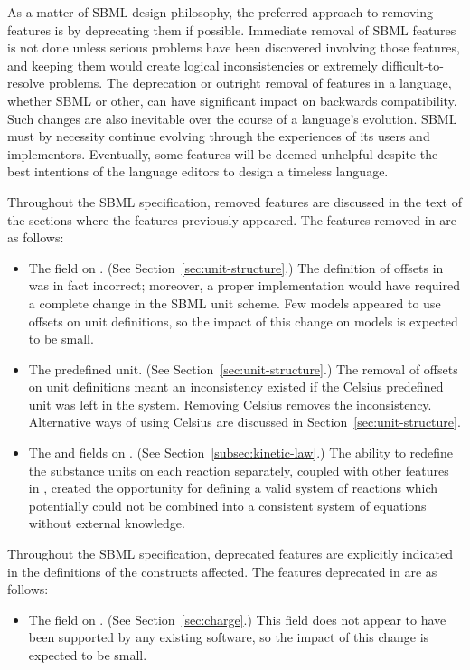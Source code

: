 As a matter of SBML design philosophy, the preferred approach to
removing features is by deprecating them if possible.  Immediate
removal of SBML features is not done unless serious problems have
been discovered involving those features, and keeping them would
create logical inconsistencies or extremely difficult-to-resolve
problems.  The deprecation or outright removal of features in a
language, whether SBML or other, can have significant impact on
backwards compatibility.  Such changes are also inevitable over
the course of a language's evolution.  SBML must by necessity
continue evolving through the experiences of its users and
implementors.  Eventually, some features will be deemed unhelpful
despite the best intentions of the language editors to design a
timeless language.

Throughout the SBML specification, removed features are discussed
in the text of the sections where the features previously appeared.
The features removed in \changed{\sbmltwothree} are as follows:
\begin{itemize}
  
\item The  field on \UnitDefinition.  (See
  Section~\ref{sec:unit-structure}.)  The definition of offsets in
  \sbmltwoone was in fact incorrect; moreover, a proper
  implementation would have required a complete change in the SBML
  unit scheme.  Few models appeared to use offsets on unit
  definitions, so the impact of this change on models is expected
  to be small.
  
\item The  predefined unit.  (See
  Section~\ref{sec:unit-structure}.)  The removal of offsets on
  unit definitions meant an inconsistency existed if the Celsius
  predefined unit was left in the system.  Removing Celsius
  removes the inconsistency.  Alternative ways of using Celsius
  are discussed in Section~\ref{sec:unit-structure}.
  
\item The  and  fields on
  \KineticLaw.  (See Section~\ref{subsec:kinetic-law}.)  The
  ability to redefine the substance units on each reaction
  separately, coupled with other features in \sbmltwotwo, created
  the opportunity for defining a valid system of reactions which
  potentially could not be combined into a consistent system of
  equations without external knowledge.

\end{itemize}
Throughout the SBML specification, deprecated features are
explicitly indicated in the definitions of the constructs
affected.  The features deprecated in \sbmltwotwo are as follows:
\begin{itemize}
  
\item The  field on \Species.  (See
  Section~\ref{sec:charge}.)  This field does not appear to have
  been supported by any existing software, so the impact of this
  change is expected to be small.

\end{itemize}

